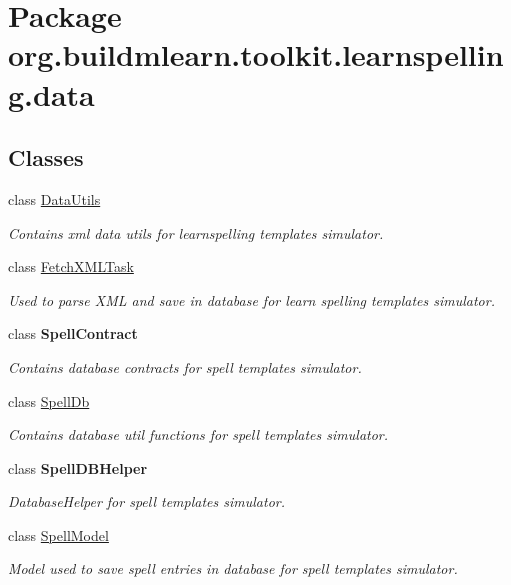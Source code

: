 \hypertarget{namespaceorg_1_1buildmlearn_1_1toolkit_1_1learnspelling_1_1data}{}\section{Package org.\+buildmlearn.\+toolkit.\+learnspelling.\+data}
\label{namespaceorg_1_1buildmlearn_1_1toolkit_1_1learnspelling_1_1data}
\subsection*{Classes}
\begin{DoxyCompactItemize}
\item 
class \hyperlink{classorg_1_1buildmlearn_1_1toolkit_1_1learnspelling_1_1data_1_1DataUtils}{Data\+Utils}
\begin{DoxyCompactList}\small\item\em Contains xml data utils for learnspelling template\textquotesingle{}s simulator. \end{DoxyCompactList}\item 
class \hyperlink{classorg_1_1buildmlearn_1_1toolkit_1_1learnspelling_1_1data_1_1FetchXMLTask}{Fetch\+X\+M\+L\+Task}
\begin{DoxyCompactList}\small\item\em Used to parse X\+ML and save in database for learn spelling template\textquotesingle{}s simulator. \end{DoxyCompactList}\item 
class {\bfseries Spell\+Contract}
\begin{DoxyCompactList}\small\item\em Contains database contracts for spell template\textquotesingle{}s simulator. \end{DoxyCompactList}\item 
class \hyperlink{classorg_1_1buildmlearn_1_1toolkit_1_1learnspelling_1_1data_1_1SpellDb}{Spell\+Db}
\begin{DoxyCompactList}\small\item\em Contains database util functions for spell template\textquotesingle{}s simulator. \end{DoxyCompactList}\item 
class {\bfseries Spell\+D\+B\+Helper}
\begin{DoxyCompactList}\small\item\em Database\+Helper for spell template\textquotesingle{}s simulator. \end{DoxyCompactList}\item 
class \hyperlink{classorg_1_1buildmlearn_1_1toolkit_1_1learnspelling_1_1data_1_1SpellModel}{Spell\+Model}
\begin{DoxyCompactList}\small\item\em Model used to save spell entries in database for spell template\textquotesingle{}s simulator. \end{DoxyCompactList}\end{DoxyCompactItemize}

